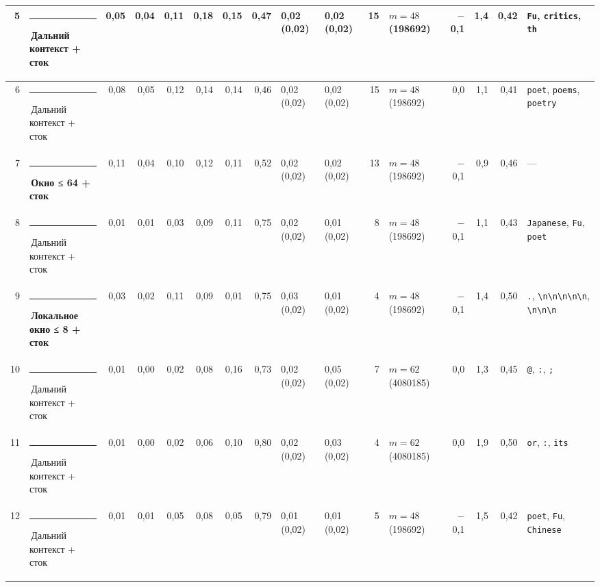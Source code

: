 \documentclass[10pt]{article}
\begin{document}
\begin{minipage}{\linewidth}
\begin{center}
{\begin{tabular}{|r|l|r|r|r|r|r|r|l|l|r|l|r|r|r|l|}
5 & \textcolor[HTML]{C3C2B7}{\rule{0.62em}{0.62em}}\,Дальний контекст + сток & 0,05 & 0,04 & 0,11 & 0,18 & 0,15 & 0,47 & 0,02 (0,02) & 0,02 (0,02) & 15 & $m{=}48$ (198692) & $-$0,1 & 1,4 & 0,42 & \texttt{\textvisiblespace{}Fu}, \texttt{\textvisiblespace{}critics}, \texttt{th} \\ \hline
6 & \textcolor[HTML]{C3C2B7}{\rule{0.62em}{0.62em}}\,Дальний контекст + сток & 0,08 & 0,05 & 0,12 & 0,14 & 0,14 & 0,46 & 0,02 (0,02) & 0,02 (0,02) & 15 & $m{=}48$ (198692) & 0,0 & 1,1 & 0,41 & \texttt{\textvisiblespace{}poet}, \texttt{\textvisiblespace{}poems}, \texttt{\textvisiblespace{}poetry} \\ \hline
7 & \textcolor[HTML]{EDA100}{\rule{0.62em}{0.62em}}\,\textbf{Окно ≤ 64 + сток} & 0,11 & 0,04 & 0,10 & 0,12 & 0,11 & 0,52 & 0,02 (0,02) & 0,02 (0,02) & 13 & $m{=}48$ (198692) & $-$0,1 & 0,9 & 0,46 & — \\ \hline
8 & \textcolor[HTML]{C3C2B7}{\rule{0.62em}{0.62em}}\,Дальний контекст + сток & 0,01 & 0,01 & 0,03 & 0,09 & 0,11 & 0,75 & 0,02 (0,02) & 0,01 (0,02) & 8 & $m{=}48$ (198692) & $-$0,1 & 1,1 & 0,43 & \texttt{\textvisiblespace{}Japanese}, \texttt{\textvisiblespace{}Fu}, \texttt{\textvisiblespace{}poet} \\ \hline
9 & \textcolor[HTML]{1BAF7A}{\rule{0.62em}{0.62em}}\,\textbf{Локальное окно ≤ 8 + сток} & 0,03 & 0,02 & 0,11 & 0,09 & 0,01 & 0,75 & 0,03 (0,02) & 0,01 (0,02) & 4 & $m{=}48$ (198692) & $-$0,1 & 1,4 & 0,50 & \texttt{\textvisiblespace{}.}, \texttt{\textvisiblespace{}\textbackslash{}n\textbackslash{}n\textbackslash{}n\textbackslash{}n\textbackslash{}n}, \texttt{\textvisiblespace{}\textbackslash{}n\textbackslash{}n\textbackslash{}n} \\ \hline
10 & \textcolor[HTML]{C3C2B7}{\rule{0.62em}{0.62em}}\,Дальний контекст + сток & 0,01 & 0,00 & 0,02 & 0,08 & 0,16 & 0,73 & 0,02 (0,02) & 0,05 (0,02) & 7 & $m{=}62$ (4080185) & 0,0 & 1,3 & 0,45 & \texttt{\textvisiblespace{}@}, \texttt{\textvisiblespace{}:}, \texttt{\textvisiblespace{};} \\ \hline
11 & \textcolor[HTML]{C3C2B7}{\rule{0.62em}{0.62em}}\,Дальний контекст + сток & 0,01 & 0,00 & 0,02 & 0,06 & 0,10 & 0,80 & 0,02 (0,02) & 0,03 (0,02) & 4 & $m{=}62$ (4080185) & 0,0 & 1,9 & 0,50 & \texttt{\textvisiblespace{}or}, \texttt{\textvisiblespace{}:}, \texttt{\textvisiblespace{}its} \\ \hline
12 & \textcolor[HTML]{C3C2B7}{\rule{0.62em}{0.62em}}\,Дальний контекст + сток & 0,01 & 0,01 & 0,05 & 0,08 & 0,05 & 0,79 & 0,01 (0,02) & 0,01 (0,02) & 5 & $m{=}48$ (198692) & $-$0,1 & 1,5 & 0,42 & \texttt{\textvisiblespace{}poet}, \texttt{\textvisiblespace{}Fu}, \texttt{\textvisiblespace{}Chinese} \\ \hline

\end{tabular}}
\end{center}
\end{minipage}
\end{document}
